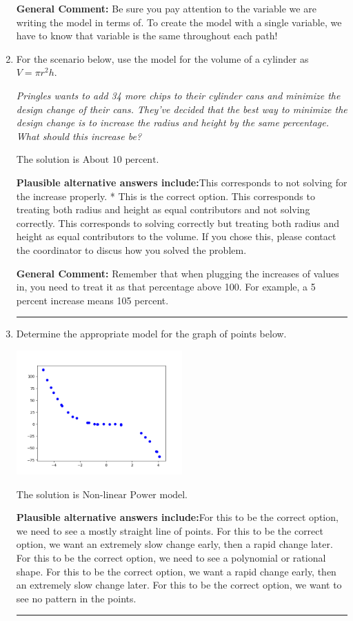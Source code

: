 \documentclass{extbook}[14pt]
\newcommand{\litem}[1]{\item #1

\rule{\textwidth}{0.4pt}}
\begin{document}
\begin{enumerate}
{\textbf{General Comment:} Be sure you pay attention to the variable we are writing the model in terms of. To create the model with a single variable, we have to know that variable is the same throughout each path!
}
\litem{
For the scenario below, use the model for the volume of a cylinder as $V = \pi r^2 h$.

\begin{center}
    \textit{ Pringles wants to add 34 \text{percent} more chips to their cylinder cans and minimize the design change of their cans. They've decided that the best way to minimize the design change is to increase the radius and height by the same percentage. What should this increase be? }
\end{center}
The solution is \( \text{About } 10 \text{ percent} \).\begin{enumerate}[label=\Alph*.]
\textbf{Plausible alternative answers include:}This corresponds to not solving for the increase properly.
* This is the correct option.
This corresponds to treating both radius and height as equal contributors and not solving correctly.
This corresponds to solving correctly but treating both radius and height as equal contributors to the volume.
If you chose this, please contact the coordinator to discus how you solved the problem.
\end{enumerate}

\textbf{General Comment:} Remember that when plugging the increases of values in, you need to treat it as that percentage above 100. For example, a 5 percent increase means 105 percent.
}
\litem{
Determine the appropriate model for the graph of points below.

\begin{center}
    \includegraphics[width=0.5\textwidth]{../Figures/identifyModelGraph12CopyA.png}
\end{center}


The solution is \( \text{Non-linear Power model} \).\begin{enumerate}[label=\Alph*.]
\textbf{Plausible alternative answers include:}For this to be the correct option, we need to see a mostly straight line of points.
For this to be the correct option, we want an extremely slow change early, then a rapid change later.
For this to be the correct option, we need to see a polynomial or rational shape.
For this to be the correct option, we want a rapid change early, then an extremely slow change later.
For this to be the correct option, we want to see no pattern in the points.
\end{enumerate}

}
\end{enumerate}
\end{document}
